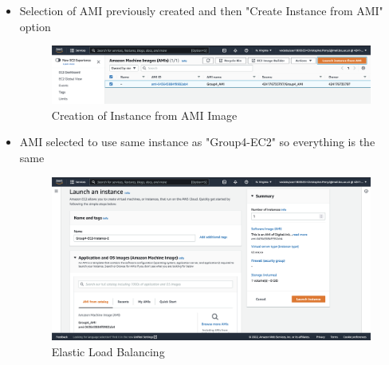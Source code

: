 \begin{itemize}
    \item Selection of AMI previously created and then "Create Instance from AMI" option \begin{figure}[!htbp]
                                                                                             \centering
                                                                                             \includegraphics[width=\textwidth]{resources/elb/elb-instance-from-ami.png}
                                                                                             \caption{Creation of Instance from AMI Image}
                                                                                             \label{fig:elb-instance-from-ami}
                                                                                        \end{figure}
    \item AMI selected to use same instance as "Group4-EC2" so everything is the same \begin{figure}[!htbp]
                                                                                          \centering
                                                                                          \includegraphics[width=\textwidth]{resources/elb/elb-instance-2-name.png}
                                                                                          \caption{Elastic Load Balancing}
                                                                                          \label{fig:elb-instance-2-name}
                                                                                    \end{figure}

\end{itemize}
